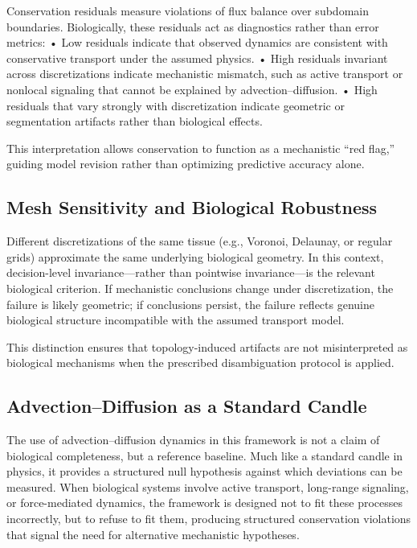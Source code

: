 \documentclass[10pt,article]{article}
\begin{document}
Conservation residuals measure violations of flux balance over subdomain boundaries. Biologically, these residuals act as diagnostics rather than error metrics:
	•	Low residuals indicate that observed dynamics are consistent with conservative transport under the assumed physics.
	•	High residuals invariant across discretizations indicate mechanistic mismatch, such as active transport or nonlocal signaling that cannot be explained by advection–diffusion.
	•	High residuals that vary strongly with discretization indicate geometric or segmentation artifacts rather than biological effects.

This interpretation allows conservation to function as a mechanistic “red flag,” guiding model revision rather than optimizing predictive accuracy alone.

\subsection{Mesh Sensitivity and Biological Robustness}

Different discretizations of the same tissue (e.g., Voronoi, Delaunay, or regular grids) approximate the same underlying biological geometry. In this context, decision-level invariance—rather than pointwise invariance—is the relevant biological criterion. If mechanistic conclusions change under discretization, the failure is likely geometric; if conclusions persist, the failure reflects genuine biological structure incompatible with the assumed transport model.

This distinction ensures that topology-induced artifacts are not misinterpreted as biological mechanisms when the prescribed disambiguation protocol is applied.

\subsection{Advection–Diffusion as a Standard Candle}

The use of advection–diffusion dynamics in this framework is not a claim of biological completeness, but a reference baseline. Much like a standard candle in physics, it provides a structured null hypothesis against which deviations can be measured. When biological systems involve active transport, long-range signaling, or force-mediated dynamics, the framework is designed not to fit these processes incorrectly, but to refuse to fit them, producing structured conservation violations that signal the need for alternative mechanistic hypotheses.
\end{document}
